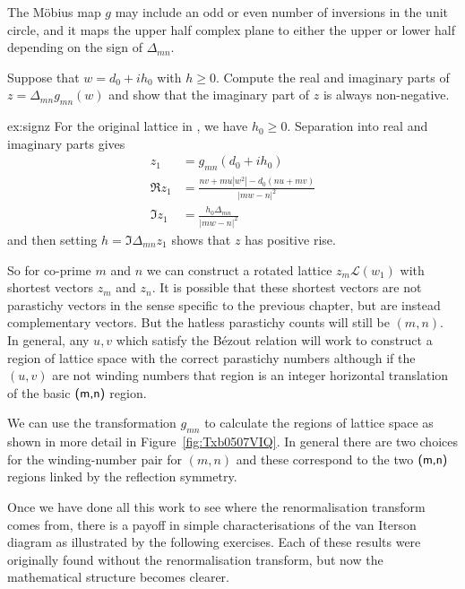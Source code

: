 The M\"obius map $g$ may include an odd or even number of inversions in the unit circle, and it maps the upper half complex plane to either the upper or lower half depending on the sign of $\Delta_{mn}$. 

\begin{jExercise}\label{ex:signz}
	Suppose that $w=d_0+ih_0$ with $h\geq 0$. Compute the real and imaginary parts of $z = \Delta_{mn}g_{mn}(w)$ and show that the imaginary part of $z$ is always non-negative.
\end{jExercise}

\begin{jAnswer}{ex:signz}
For the original lattice in , we have $h_0\geq0$. Separation into real and imaginary parts  gives
	\begin{align}
		z_1 &= g_{mn}(d_0+ih_0) 
		\\
		\Re z_1 &= 
		\frac{n v + m u| w^2|	- d_0( n u + m v)}{|m w-n|^2} 
			\\
			\Im z_1 &=
	\frac{	 h_0 \Delta_{mn}}{|m w-n|^2}
	\label{eq:gReImA}
\end{align}
and then setting $h=\Im \Delta_{mn}z_1$ shows that $z$ has positive rise.
\end{jAnswer}

 So for co-prime $m$ and $n$ we can construct a rotated lattice $z_m \mathcal{L}(w_1)$  with shortest vectors $z_m$ and $z_n$. It is possible that these shortest vectors are not parastichy vectors in the sense specific to the previous chapter, but are instead complementary vectors. But the hatless parastichy counts will still be $(m,n)$. In general, any $u,v$ which satisfy the B\'ezout relation will work to construct a region of lattice space with the correct parastichy numbers although if the $(u,v)$ are not winding numbers that region is an integer horizontal translation of the basic $\textsf{(m,n)}$ region.
 	


We can use the transformation $g_{mn}$ to calculate the regions of
lattice space as shown in more detail in Figure~\ref{fig:Txb0507VIQ}.
In general there are two choices for the winding-number pair for $(m,n)$ and these correspond to the two $\textsf{(m,n)}$ regions linked by the reflection symmetry.



Once we have done all this work to see where the renormalisation transform comes from, there is a payoff in simple characterisations of the van Iterson diagram  as illustrated by the following exercises. Each of these results were originally found without the renormalisation transform, but now the mathematical structure becomes clearer. 


